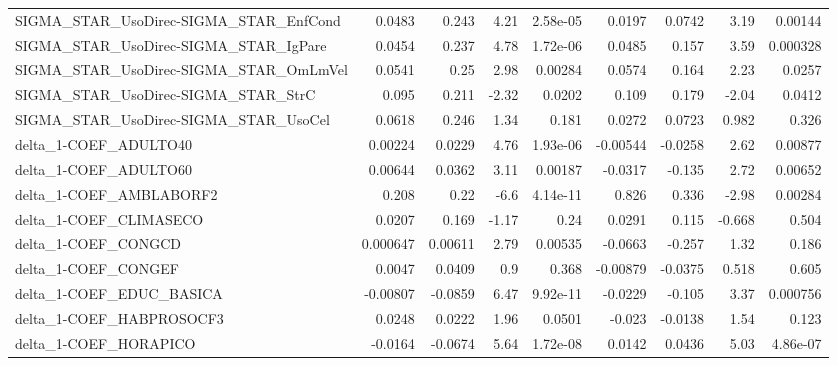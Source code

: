 \begin{tabular}{lrrrrrrrr}
SIGMA\_STAR\_UsoDirec-SIGMA\_STAR\_EnfCond &      0.0483 &        0.243 &    4.21 & 2.58e-05 &     0.0197 &      0.0742 &         3.19 &       0.00144 \\
SIGMA\_STAR\_UsoDirec-SIGMA\_STAR\_IgPare  &      0.0454 &        0.237 &    4.78 & 1.72e-06 &     0.0485 &       0.157 &         3.59 &      0.000328 \\
SIGMA\_STAR\_UsoDirec-SIGMA\_STAR\_OmLmVel &      0.0541 &         0.25 &    2.98 &  0.00284 &     0.0574 &       0.164 &         2.23 &        0.0257 \\
SIGMA\_STAR\_UsoDirec-SIGMA\_STAR\_StrC    &       0.095 &        0.211 &   -2.32 &   0.0202 &      0.109 &       0.179 &        -2.04 &        0.0412 \\
SIGMA\_STAR\_UsoDirec-SIGMA\_STAR\_UsoCel  &      0.0618 &        0.246 &    1.34 &    0.181 &     0.0272 &      0.0723 &        0.982 &         0.326 \\
delta\_1-COEF\_ADULTO40                  &     0.00224 &       0.0229 &    4.76 & 1.93e-06 &   -0.00544 &     -0.0258 &         2.62 &       0.00877 \\
delta\_1-COEF\_ADULTO60                  &     0.00644 &       0.0362 &    3.11 &  0.00187 &    -0.0317 &      -0.135 &         2.72 &       0.00652 \\
delta\_1-COEF\_AMBLABORF2                &       0.208 &         0.22 &    -6.6 & 4.14e-11 &      0.826 &       0.336 &        -2.98 &       0.00284 \\
delta\_1-COEF\_CLIMASECO                 &      0.0207 &        0.169 &   -1.17 &     0.24 &     0.0291 &       0.115 &       -0.668 &         0.504 \\
delta\_1-COEF\_CONGCD                    &    0.000647 &      0.00611 &    2.79 &  0.00535 &    -0.0663 &      -0.257 &         1.32 &         0.186 \\
delta\_1-COEF\_CONGEF                    &      0.0047 &       0.0409 &     0.9 &    0.368 &   -0.00879 &     -0.0375 &        0.518 &         0.605 \\
delta\_1-COEF\_EDUC\_BASICA               &    -0.00807 &      -0.0859 &    6.47 & 9.92e-11 &    -0.0229 &      -0.105 &         3.37 &      0.000756 \\
delta\_1-COEF\_HABPROSOCF3               &      0.0248 &       0.0222 &    1.96 &   0.0501 &     -0.023 &     -0.0138 &         1.54 &         0.123 \\
delta\_1-COEF\_HORAPICO                  &     -0.0164 &      -0.0674 &    5.64 & 1.72e-08 &     0.0142 &      0.0436 &         5.03 &      4.86e-07 \\

\end{tabular}
